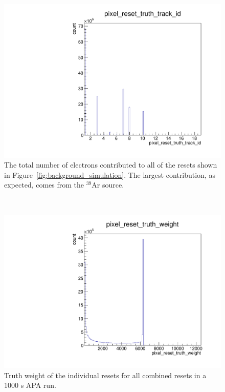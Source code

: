 \begin{figure}[]
\centering
\includegraphics[width=\textwidth]{images/pixel_reset_truth_track_id.pdf}
\caption{The total number of electrons contributed to all of the resets shown in Figure~\ref{fig:background_simulation}. 
The largest contribution, as expected, comes from the $^{39}$Ar source.
}
\end{figure}~\label{fig:pixel_track_id}

\begin{figure}[]
\centering
\includegraphics[width=\textwidth]{images/pixel_reset_truth_weight.pdf}
\caption{Truth weight of the individual resets for all combined resets in a 1000 s APA run.}
\end{figure}~\label{fig:pixel_truth_weight}


